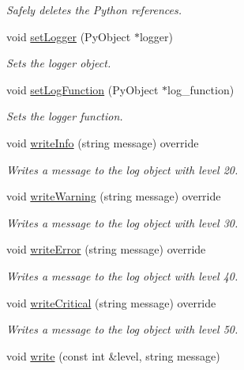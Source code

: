 \begin{DoxyCompactItemize}
\begin{DoxyCompactList}\small\item\em Safely deletes the Python references. \end{DoxyCompactList}\item 
void \hyperlink{class_py_logger_abedc912ce779111d343a739b72316498}{set\+Logger} (Py\+Object $\ast$logger)
\begin{DoxyCompactList}\small\item\em Sets the logger object. \end{DoxyCompactList}\item 
void \hyperlink{class_py_logger_afee8574d4db27060530daf1c54daf4ce}{set\+Log\+Function} (Py\+Object $\ast$log\+\_\+function)
\begin{DoxyCompactList}\small\item\em Sets the logger function. \end{DoxyCompactList}\item 
void \hyperlink{class_py_logger_a1c9735d6b83c1fad66bb6560cd753616}{write\+Info} (string message) override
\begin{DoxyCompactList}\small\item\em Writes a message to the log object with level 20. \end{DoxyCompactList}\item 
void \hyperlink{class_py_logger_acba053c66f9e6d2c3fd83a83b495afe4}{write\+Warning} (string message) override
\begin{DoxyCompactList}\small\item\em Writes a message to the log object with level 30. \end{DoxyCompactList}\item 
void \hyperlink{class_py_logger_a445bc845376cd5abd65b25c534192a47}{write\+Error} (string message) override
\begin{DoxyCompactList}\small\item\em Writes a message to the log object with level 40. \end{DoxyCompactList}\item 
void \hyperlink{class_py_logger_aa71e9531bf2bc4084427a78016407666}{write\+Critical} (string message) override
\begin{DoxyCompactList}\small\item\em Writes a message to the log object with level 50. \end{DoxyCompactList}\item 
void \hyperlink{class_py_logger_a251422c4f32349547cac003379459be7}{write} (const int \&level, string message)

\end{DoxyCompactItemize}
